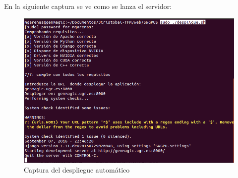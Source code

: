 En la siguiente captura se ve como se lanza el servidor:

\bigskip
\begin{figure}[h]
	\centering
	\includegraphics[width=1\linewidth]{../images/prueba_despliegue}
	\caption[Captura del despliegue automático]{Captura del despliegue automático}
	\label{fig:prueba_despliegue}
\end{figure}


